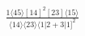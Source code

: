 \documentclass[varwidth, border=5pt]{standalone}
\begin{document}
\begin{my}
$\begin{gathered}
\scriptscriptstyle\frac{1⟨45⟩[14]^2[23]⟨15⟩}{⟨14⟩⟨23⟩⟨1|2+3|1]^2}
\end{gathered}$
\end{my}
\end{document}
